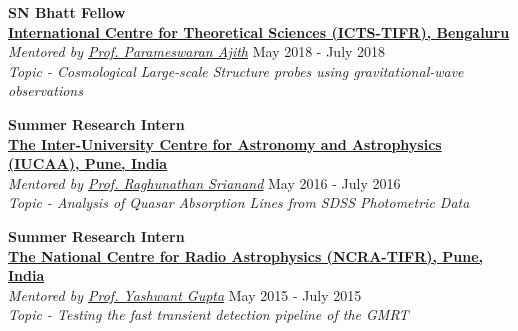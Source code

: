 \documentclass[11pt, margin, centered, letterpaper]{res}
\begin{document}
\begin{resume}
\textbf{SN Bhatt Fellow}
\\
\textbf{\href{https://www.icts.res.in/}{International Centre for Theoretical Sciences (ICTS-TIFR), Bengaluru}}\\
\emph{Mentored by \href{https://home.icts.res.in/~ajith/Home.html}{Prof. Parameswaran Ajith}} \hfill May 2018 - July 2018\\
\textit{Topic - Cosmological Large-scale Structure probes using gravitational-wave observations}


\textbf{Summer Research Intern}
\\
\textbf{\href{http://www.iucaa.ernet.in/}{The Inter-University Centre for Astronomy and Astrophysics (IUCAA), Pune, India}}
\\
\emph{Mentored by \href{http://www.iucaa.ernet.in/~anand/}{Prof. Raghunathan Srianand}} \hfill May 2016 - July 2016\\
\textit{Topic - Analysis of Quasar Absorption Lines from SDSS Photometric Data}

\textbf{Summer Research Intern}\\
\textbf{\href{http://www.ncra.tifr.res.in/}{The National Centre for Radio Astrophysics (NCRA-TIFR), Pune, India}}\\
\emph{Mentored by \href{http://www.ncra.tifr.res.in/ncra/people/academic/ncra-faculty/Yashwant_Gupta}{Prof. Yashwant Gupta}} \hfill May 2015 - July 2015\\
\textit{Topic - Testing the fast transient detection pipeline of the GMRT}

\begin{comment}



\end{comment}
\end{resume}
\end{document}
